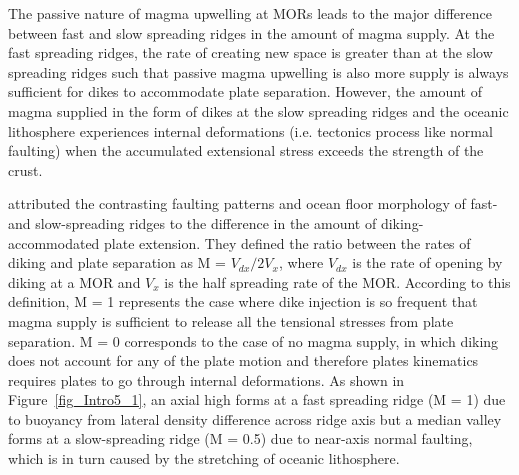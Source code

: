 The passive nature of magma upwelling at MORs leads to the major difference between fast and slow spreading ridges in the amount of magma supply.  At the fast spreading ridges, the rate of creating new space is greater than at the slow spreading ridges such that passive magma upwelling is also more supply is always sufficient for dikes to accommodate plate separation. However, the amount of magma supplied in the form of dikes at the slow spreading ridges and the oceanic lithosphere experiences internal deformations (i.e. tectonics process like normal faulting) when the accumulated extensional stress exceeds the strength of the crust.

\citet{Buck2005} attributed the contrasting faulting patterns and ocean floor morphology of fast- and slow-spreading ridges to the difference in the amount of diking-accommodated plate extension. They defined the ratio between the rates of diking and plate separation as M = $V_{dx}/2V_{x}$, where $V_{dx}$ is the rate of opening by diking at a MOR and $V_{x}$ is the half spreading rate of the MOR. According to this definition, M = 1 represents the case where dike injection is so frequent that magma supply is sufficient to release all the tensional stresses from plate separation. M = 0 corresponds to the case of no magma supply, in which diking does not account for any of the plate motion and therefore plates kinematics requires plates to go through internal deformations. As shown in Figure~\ref{fig_Intro5_1}, an axial high forms at a fast spreading ridge (M = 1) due to buoyancy from lateral density difference across ridge axis but a median valley forms at a slow-spreading ridge (M = 0.5) due to near-axis normal faulting, which is in turn caused by the stretching of oceanic lithosphere.


